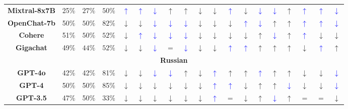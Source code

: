 \documentclass{article}
\newcommand{\bluearrow}[1]{\textcolor{blue}{#1}}
\begin{document}
\begin{table}[!ht]
{\begin{tabular}{c|cc|c|ccc|ccc|ccc|ccc|ccc}
\hline
\textbf{Mixtral-8x7B} & 25\% & $27\%$ & $50\%$ & \bluearrow{$\uparrow$} & \bluearrow{$\uparrow$} & \bluearrow{$\downarrow$} & $\uparrow$ & $\uparrow$ & $\downarrow$ & $\downarrow$ & \bluearrow{$\uparrow$} & $\downarrow$ & \bluearrow{$\downarrow$} & \bluearrow{$\downarrow$} & $\uparrow$ & \bluearrow{$\uparrow$} & \bluearrow{$\uparrow$} & \bluearrow{$\downarrow $}\\
\textbf{OpenChat-7b} & 50\% & $50\%$ & $82\%$ & $\downarrow$ & $\downarrow$ & \bluearrow{$\downarrow$} & \bluearrow{$\downarrow$} & \bluearrow{$\downarrow$} & $\downarrow$ & $\downarrow$ & $\downarrow$ & \bluearrow{$\uparrow$} & \bluearrow{$\downarrow$} & $\uparrow$ & $\uparrow$ & \bluearrow{$\uparrow$} & \bluearrow{$\uparrow$} & \bluearrow{$\downarrow $}\\
\hline
\textbf{Cohere} & 51\% & $50\%$ & $52\%$ & $\downarrow$ & \bluearrow{$\uparrow$} & \bluearrow{$\downarrow$} & \bluearrow{$\downarrow$} & \bluearrow{$\downarrow$} & $\downarrow$ & $\downarrow$ & $\downarrow$ & $\downarrow$ & $\uparrow$ & \bluearrow{$\downarrow$} & $\uparrow$ & \bluearrow{$\uparrow$} & $\downarrow$ & $\downarrow  $\\
\textbf{Gigachat} & 49\% & $44\%$ & $52\%$ & $\downarrow$ & $\downarrow$ & \bluearrow{$\downarrow$} & $=$ & \bluearrow{$\downarrow$} & $\downarrow$ & $\downarrow$ & \bluearrow{$\uparrow$} & \bluearrow{$\uparrow$} & $\uparrow$ & $\uparrow$ & $\uparrow$ & $\downarrow$ & \bluearrow{$\uparrow$} & $\uparrow   $\\
\hline
\multicolumn{19}{c}{\textbf{Russian}} \\ \hline
\textbf{GPT-4o}  & 42\% & 42\%  & 81\% & $\downarrow$ & $\downarrow$ &  \bluearrow{$\downarrow$} &  \bluearrow{$\downarrow$} & $\uparrow$ & $\downarrow$ & \bluearrow{$\uparrow$} & $\uparrow$ & $\uparrow$ & \bluearrow{$\uparrow$} & $\uparrow$  & $\uparrow$ & $\downarrow$ & $\downarrow$ & \bluearrow{$\downarrow$} \\ 
\textbf{GPT-4}  & 50\% & 50\%  & 85\% & $\downarrow$ & $\downarrow$ & $\downarrow$ & $\downarrow$ & $\downarrow$ & $\downarrow$ & \bluearrow{$\uparrow$} & \bluearrow{$\uparrow$} & $\downarrow$ & $\uparrow$ & $\uparrow$  & \bluearrow{$\downarrow$} & $\downarrow$ & $\downarrow$ & \bluearrow{$\downarrow$} \\ 
\textbf{GPT-3.5}  & 47\% & 50\%  & 33\% & $\downarrow$ & $\downarrow$ & $\downarrow$ & $\downarrow$ & $\downarrow$ & $\downarrow$ & \bluearrow{$\uparrow$} & $=$ & $\downarrow$ & $\uparrow$ & \bluearrow{$\downarrow$} & $\uparrow$ & $=$ & $=$ & $\downarrow$  \\

\end{tabular}}
\end{table}
\end{document}
